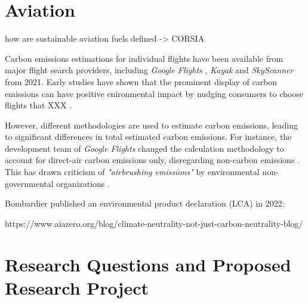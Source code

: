 \documentclass{article}
\begin{document}
    
        
    
\section{Aviation}

    
        

\cite{prussi_corsia_2021}

how are sustainable aviation fuels defined -> CORSIA \cite{prussi_corsia_2021}

    Carbon emissions estimations for individual flights have been available from major flight search providers, including \textit{Google Flights} \cite{holden_google_2021}, \textit{Kayak} \cite{noauthor_kayak_2021} and \textit{SkyScanner} \cite{crosthwaite_how_2021} from 2021. Early studies have shown that the prominent display of carbon emissions can have positive enironmental impact by nudging consumers to choose flights that XXX \cite{amenta_adding_2020}\cite{sanguinetti_nudging_2022}.
    
    However, different methodologies are used to estimate carbon emissions, leading to significant differences in total estimated carbon emissions. For instance, the development team of \textit{Google Flights} changed the calculation methodology to account for direct-air carbon emissions only, disregarding non-carbon emissions \cite{ali_commit_2022}. This has drawn criticism of \textit{"airbrushing emissions"} by environmental non-governmental organizations \cite{hern_google_2022}\cite{rowlatt_google_2022}.
    
    Bombardier published an environmental product declaration (LCA) in 2022: \cite{noauthor_challenger_2022}

https://www.aiazero.org/blog/climate-neutrality-not-just-carbon-neutrality-blog/
    
\section{Research Questions and Proposed Research Project}
    
\end{document}
